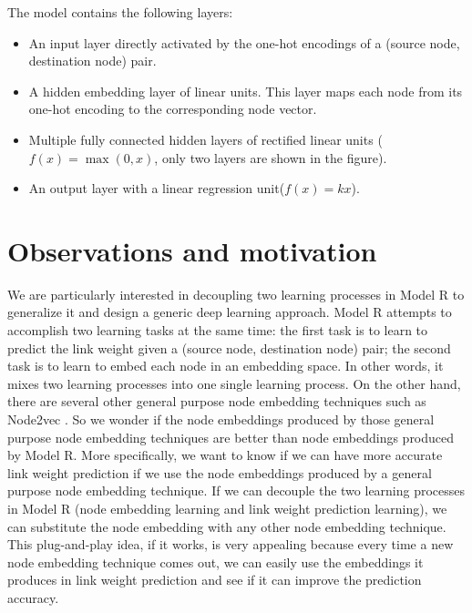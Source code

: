 \documentclass{article} %
\begin{document}
The model contains the following layers:
\begin{itemize}
	\item An input layer directly activated by the one-hot encodings of a (source node, destination node) pair.
	\item A hidden embedding layer of linear units.
	This layer maps each node from its one-hot encoding to the corresponding node vector.
	\item Multiple fully connected hidden layers of rectified linear units
	($ f(x) = \max (0, x) $, only two layers are shown in the figure).
	\item An output layer with a linear regression unit($ f(x) = kx $).
\end{itemize}


\section{Observations and motivation}
We are particularly interested in decoupling two learning processes in Model R to generalize it and design a generic deep learning approach.
Model R attempts to accomplish two learning tasks at the same time:
the first task is to learn to predict the link weight given a (source node, destination node) pair; the second task is to learn to embed each node in an embedding space.
In other words, it mixes two learning processes into one single learning process.
On the other hand, there are several other general purpose node embedding techniques such as Node2vec \citep{grover2016node2vec}.
So we wonder if the node embeddings produced by those general purpose node embedding techniques are better than node embeddings produced by Model R.
More specifically, we want to know if we can have more accurate link weight prediction if we use the node embeddings produced by a general purpose node embedding technique.
If we can decouple the two learning processes in Model R (node embedding learning and link weight prediction learning), we can substitute the node embedding with any other node embedding technique.
This plug-and-play idea, if it works, is very appealing because every time a new node embedding technique comes out, we can easily use the embeddings it produces in link weight prediction and see if it can improve the prediction accuracy.
\end{document}
